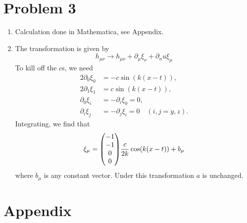 \documentclass[12pt]{article}
\begin{document}
\section*{Problem 3}
\begin{enumerate}[label=(\alph*)]
    \item Calculation done in Mathematica, see Appendix.
    \item The transformation is given by 
    \[ h_{\mu\nu} \to h_{\mu\nu} + \partial_{\mu}\xi_\nu + \partial_nu\xi_\mu \]
    To kill off the $c$s, we need 
    \begin{align*}
        2\partial_0\xi_0 &= -c\sin(k(x-t)), \\
        2\partial_1\xi_1 &= c\sin(k(x-t)), \\
        \partial_0\xi_i &= -\partial_i\xi_0 = 0, \\
        \partial_i\xi_j &= -\partial_j\xi_i = 0 \quad (i,j = y,z).
    \end{align*}
    Integrating, we find that
    \[ \xi_\mu = \mqty(-1\\-1\\0\\0)\frac{c}{2k}\cos(k(x-t)) + b_\mu \]
    where $b_\mu$ is any constant vector. Under this transformation $a$ is unchanged.
\end{enumerate}

\section*{Appendix}

\end{document}
